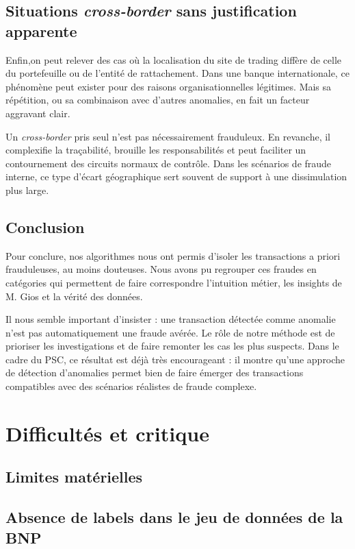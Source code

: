 \documentclass[a4paper]{article}
\begin{document}
\subsection{Situations \textit{cross-border} sans justification apparente}

Enfin,on peut relever des cas où la localisation du site de trading diffère de celle du portefeuille ou de l'entité de rattachement. Dans une banque internationale, ce phénomène peut exister pour des raisons organisationnelles légitimes. Mais sa répétition, ou sa combinaison avec d'autres anomalies, en fait un facteur aggravant clair.

Un \textit{cross-border} pris seul n'est pas nécessairement frauduleux. En revanche, il complexifie la traçabilité, brouille les responsabilités et peut faciliter un contournement des circuits normaux de contrôle. Dans les scénarios de fraude interne, ce type d'écart géographique sert souvent de support à une dissimulation plus large.

\subsection{Conclusion}
Pour conclure, nos algorithmes nous ont permis d'isoler les transactions a priori frauduleuses, au moins douteuses. 
Nous avons pu regrouper ces fraudes en  catégories qui permettent de faire correspondre l'intuition métier, les insights de M. Gios et la vérité des données.  

Il nous semble important d'insister : une transaction détectée comme anomalie n'est pas automatiquement une fraude avérée. Le rôle de notre méthode est de prioriser les investigations et de faire remonter les cas les plus suspects. Dans le cadre du PSC, ce résultat est déjà très encourageant : il montre qu'une approche de détection d'anomalies permet bien de faire émerger des transactions compatibles avec des scénarios réalistes de fraude complexe. 

\section{Difficultés et critique}

\subsection{Limites matérielles}

\subsection{Absence de labels dans le jeu de données de la BNP}
\end{document}
